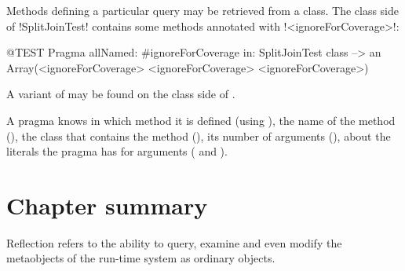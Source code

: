 \documentclass[a4paper,10pt,twoside]{book}
\begin{document}
Methods defining a particular query may be retrieved from a class. The class side of \ct!SplitJoinTest! contains some methods annotated with \ct!<ignoreForCoverage>!:

\begin{code}{@TEST}
Pragma allNamed: #ignoreForCoverage in: SplitJoinTest class  --> an Array(<ignoreForCoverage> <ignoreForCoverage> <ignoreForCoverage>)
\end{code}

A variant of  may be found on the class side of .

A pragma knows in which method it is defined (using ), the name of the method (), the class that contains the method (), its number of arguments (), about the literals the pragma has for arguments ( and ). 


\section{Chapter summary}

Reflection refers to the ability to query, examine and even modify the metaobjects of the run-time system as ordinary objects.
\end{document}
